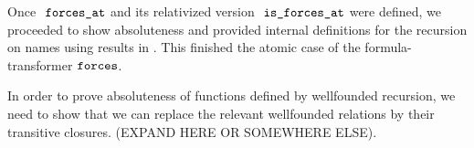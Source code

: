 Once $\forcesat$ and its relativized version $\isatt{is\_forces\_at}$
were defined, we proceeded to show absoluteness and provided internal
definitions for the recursion on names using results in
. This finished the atomic case of the
formula-transformer $\mathop{\mathtt{forces}}$. 

\begin{framed}
  In order to prove absoluteness of functions defined by wellfounded
  recursion, we need to show that we can replace the relevant
  wellfounded relations by their transitive closures. (EXPAND HERE OR
  SOMEWHERE ELSE).
\end{framed}


